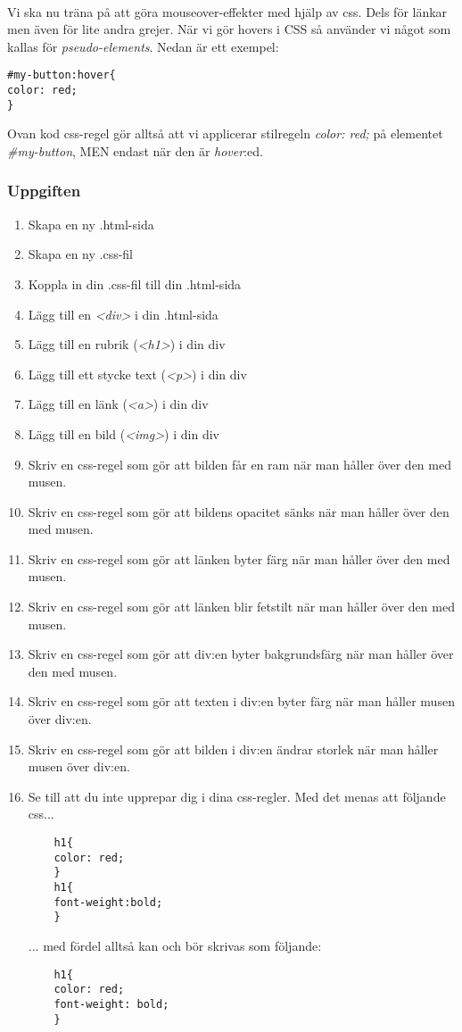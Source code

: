 \documentclass{article}
\begin{document}
\paragraph{}
Vi ska nu träna på att göra mouseover-effekter med hjälp av css. Dels för länkar men även för lite andra grejer. När vi gör hovers i CSS så använder vi något som kallas för \emph{pseudo-elements}. Nedan är ett exempel:
\begin{lstlisting}
#my-button:hover{
color: red;
}
\end{lstlisting}
Ovan kod css-regel gör alltså att vi applicerar stilregeln \emph{color: red; } på elementet \emph{\#my-button}, MEN endast när den är \emph{hover}:ed.

\subsubsection*{Uppgiften}
\begin{enumerate}
	\item Skapa en ny .html-sida
	\item Skapa en ny .css-fil
	\item Koppla in din .css-fil till din .html-sida
	\item Lägg till en \emph{<div>} i din .html-sida
	\item Lägg till en rubrik (\emph{<h1>}) i din div
	\item Lägg till ett stycke text (\emph{<p>}) i din div
	\item Lägg till en länk (\emph{<a>}) i din div
	\item Lägg till en bild (\emph{<img>}) i din div
	\item Skriv en css-regel som gör att bilden får en ram när man håller över den med musen.
	\item Skriv en css-regel som gör att bildens opacitet sänks när man håller över den med musen.
	\item Skriv en css-regel som gör att länken byter färg när man håller över den med musen.
	\item Skriv en css-regel som gör att länken blir fetstilt när man håller över den med musen.
	\item Skriv en css-regel som gör att div:en byter bakgrundsfärg när man håller över den med musen.
	\item Skriv en css-regel som gör att texten i div:en byter färg när man håller musen över div:en.
	\item Skriv en css-regel som gör att bilden i div:en ändrar storlek när man håller musen över div:en.
	\item Se till att du inte upprepar dig i dina css-regler.
	Med det menas att följande css...
	\begin{lstlisting}
	h1{
	color: red;
	}
	h1{
	font-weight:bold;
	}
	\end{lstlisting}
	... med fördel alltså kan och bör skrivas som följande:
	\begin{lstlisting}
	h1{
	color: red;
	font-weight: bold;
	}
	\end{lstlisting}
\end{enumerate}
\end{document}
